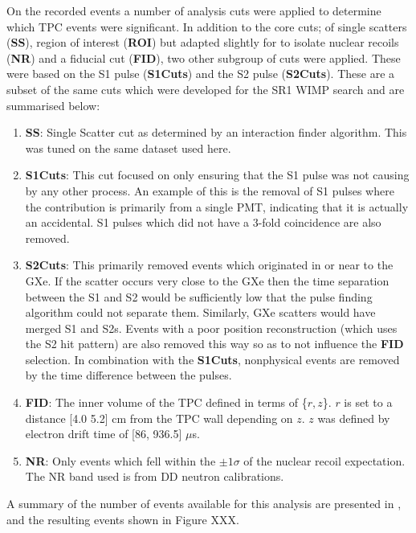 \par
On the recorded events a number of analysis cuts were applied to determine which TPC events were significant.
In addition to the core cuts; of single scatters (\textbf{SS}), region of interest (\textbf{ROI}) but adapted slightly for to isolate nuclear recoils (\textbf{NR}) and a fiducial cut (\textbf{FID}), two other subgroup of cuts were applied.
These were based on the S1 pulse (\textbf{S1Cuts}) and the S2 pulse (\textbf{S2Cuts}).
These are a subset of the same cuts which were developed for the SR1 WIMP search \cite{lz_ws_sr1_ref} and are summarised below:
\begin{enumerate}
    \item \textbf{SS}: Single Scatter cut as determined by an interaction finder algorithm. This was tuned on the same dataset used here.
    \item \textbf{S1Cuts}: This cut focused on only ensuring that the S1 pulse was not causing by any other process. An example of this is the removal of S1 pulses where the contribution is primarily from a single PMT, indicating that it is actually an accidental. S1 pulses which did not have a 3-fold coincidence are also removed.
    \item \textbf{S2Cuts}: This primarily removed events which originated in or near to the GXe. If the scatter occurs very close to the GXe then the time separation between the S1 and S2 would be sufficiently low that the pulse finding algorithm could not separate them. Similarly, GXe scatters would have merged S1 and S2s. Events with a poor position reconstruction (which uses the S2 hit pattern) are also removed this way so as to not influence the \textbf{FID} selection. In combination with the \textbf{S1Cuts}, nonphysical events are removed by the time difference between the pulses.
    \item \textbf{FID}: The inner volume of the TPC defined in terms of \{$r,z$\}. $r$ is set to a distance [4.0 5.2] cm from the TPC wall depending on $z$. $z$ was defined by electron drift time of [86, 936.5] $\mu$s.
    \item \textbf{NR}: Only events which fell within the $\pm 1\sigma$ of the nuclear recoil expectation. The NR band used is from DD neutron calibrations.
\end{enumerate}
A summary of the number of events available for this analysis are presented in \cite{tab:amli_calibration_summary}, and the resulting events shown in Figure XXX.


